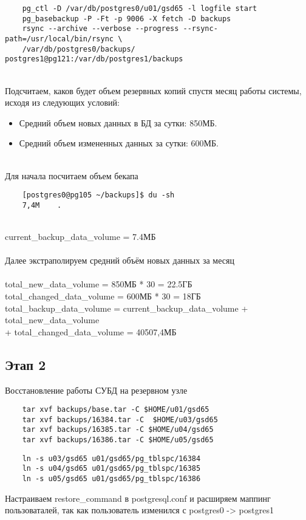 \documentclass{article}
\begin{document}
\begin{verbatim}
    pg_ctl -D /var/db/postgres0/u01/gsd65 -l logfile start
    pg_basebackup -P -Ft -p 9006 -X fetch -D backups
    rsync --archive --verbose --progress --rsync-path=/usr/local/bin/rsync \
    /var/db/postgres0/backups/ postgres1@pg121:/var/db/postgres1/backups 
\end{verbatim} \\
Подсчитаем, каков будет объем резервных копий спустя месяц работы системы, исходя из следующих условий:
    \begin{itemize}
        \item Средний объем новых данных в БД за сутки: 850МБ.
        \item Средний объем измененных данных за сутки: 600МБ.
    \end{itemize} \\
Для начала посчитаем объем бекапа
\begin{verbatim}
    [postgres0@pg105 ~/backups]$ du -sh
    7,4M	.
\end{verbatim} \\
current\_backup\_data\_volume = 7.4МБ \\ \\
Далее экстраполируем средний объём новых данных за месяц \\ \\
total\_new\_data\_volume = 850МБ * 30 = 22.5ГБ \\
total\_changed\_data\_volume = 600МБ * 30 = 18ГБ \\
total\_backup\_data\_volume = current\_backup\_data\_volume + total\_new\_data\_volume \\ + total\_changed\_data\_volume = 40507,4МБ

\subsection{Этап 2}
Восстановление работы СУБД на резервном узле
\begin{verbatim}
    tar xvf backups/base.tar -C $HOME/u01/gsd65
    tar xvf backups/16384.tar -C  $HOME/u03/gsd65
    tar xvf backups/16385.tar -C $HOME/u04/gsd65
    tar xvf backups/16386.tar -C $HOME/u05/gsd65
\end{verbatim}

\begin{verbatim}
    ln -s u03/gsd65 u01/gsd65/pg_tblspc/16384
    ln -s u04/gsd65 u01/gsd65/pg_tblspc/16385
    ln -s u05/gsd65 u01/gsd65/pg_tblspc/16386
\end{verbatim}
Настраиваем restore\_command в postgresql.conf и расширяем маппинг пользоваталей, так как пользователь изменился с postgres0 -> postgres1
\end{document}
